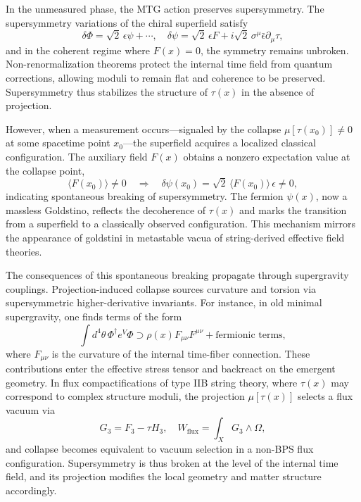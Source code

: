 \documentclass[11pt]{article}
\begin{document}
In the unmeasured phase, the MTG action preserves supersymmetry. The supersymmetry variations of the chiral superfield satisfy
\[
\delta \Phi = \sqrt{2} \, \epsilon \psi + \cdots, \quad \delta \psi = \sqrt{2} \, \epsilon F + i \sqrt{2} \, \sigma^\mu \bar{\epsilon} \partial_\mu \tau,
\]
and in the coherent regime where \( F(x) = 0 \), the symmetry remains unbroken. Non-renormalization theorems protect the internal time field from quantum corrections, allowing moduli to remain flat and coherence to be preserved. Supersymmetry thus stabilizes the structure of \( \tau(x) \) in the absence of projection.

However, when a measurement occurs—signaled by the collapse \( \mu[\tau(x_0)] \neq 0 \) at some spacetime point \( x_0 \)—the superfield acquires a localized classical configuration. The auxiliary field \( F(x) \) obtains a nonzero expectation value at the collapse point,
\begin{equation}
\langle F(x_0) \rangle \neq 0 \quad \Rightarrow \quad \delta \psi(x_0) = \sqrt{2} \, \langle F(x_0) \rangle \, \epsilon \neq 0,
\end{equation}
indicating spontaneous breaking of supersymmetry. The fermion \( \psi(x) \), now a massless Goldstino, reflects the decoherence of \( \tau(x) \) and marks the transition from a superfield to a classically observed configuration. This mechanism mirrors the appearance of goldstini in metastable vacua of string-derived effective field theories.

The consequences of this spontaneous breaking propagate through supergravity couplings. Projection-induced collapse sources curvature and torsion via supersymmetric higher-derivative invariants. For instance, in old minimal supergravity, one finds terms of the form
\[
\int d^4\theta \, \Phi^\dagger e^V \Phi \supset \rho(x) F_{\mu\nu} F^{\mu\nu} + \text{fermionic terms},
\]
where \( F_{\mu\nu} \) is the curvature of the internal time-fiber connection. These contributions enter the effective stress tensor and backreact on the emergent geometry. In flux compactifications of type IIB string theory, where \( \tau(x) \) may correspond to complex structure moduli, the projection \( \mu[\tau(x)] \) selects a flux vacuum via
\[
G_3 = F_3 - \tau H_3, \quad W_{\mathrm{flux}} = \int_X G_3 \wedge \Omega,
\]
and collapse becomes equivalent to vacuum selection in a non-BPS flux configuration. Supersymmetry is thus broken at the level of the internal time field, and its projection modifies the local geometry and matter structure accordingly.
\end{document}
